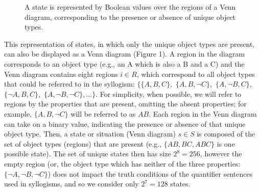 \documentclass[floatsintext, doc]{apa6}
\def\firstcircle{(90:1cm) circle (1.5cm)}
\def\secondcircle{(210:1cm) circle (1.5cm)}
\def\thirdcircle{(330:1cm) circle (1.5cm)}
\begin{document}
\begin{figure}[h]
\centering
\label{fig:venn}
\caption{A state is represented by Boolean values over the regions of a Venn diagram, corresponding to the presence or absence of unique object types.}
\end{figure}


This representation of states, in which only the unique object types are present, can also be displayed as a Venn diagram (Figure 1).
A region in the diagram corresponds to an object type (e.g., an A which is also a B and a C) and the Venn diagram contains eight regions $i \in R$, which correspond to all object types that could be referred to in the syllogism: $\{\{A,B,C\},$ $\{A,B,\neg C\},$ $\{A,\neg B,C\},$ $\{\neg A, B, C\},$ $\{A, \neg B, \neg C\},...\}$. For simplicity, when possible, we will refer to regions by the properties that are present, omitting the absent properties; for example, $\{A, B, \neg C\}$ will be referred to as $AB$.
Each region in the Venn diagram can take on a binary value, indicating the presence or absence of that unique object type.
Then, a state or situation (Venn diagram) $s \in S$ is composed of the set of object types (regions) that are present (e.g., $\{AB, BC, ABC\}$ is one possible state).
The set of unique states then has size $2^8 = 256$, however the empty region (or, the object type which has neither of the three properties: $\{\neg A, \neg B, \neg C\}$) does not impact the truth conditions of the quantifier sentences used in syllogisms, and so we consider only $2^7 = 128$ states.
\end{document}
